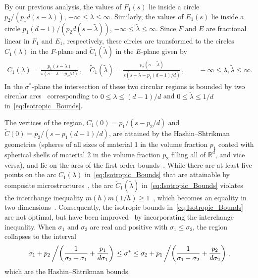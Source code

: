 \documentclass{cmslatex}
\begin{document}
By our previous analysis, the values of $F_1(s)$ lie inside a circle
$p_2/(p_1d(s-\lambda))$, $-\infty\leq\lambda\leq\infty$. Similarly, the values of $E_1(s)$ lie
inside a circle $p_1(d-1)/(p_2d(s-\tilde{\lambda}))$,
$-\infty\leq\tilde{\lambda}\leq\infty$. Since $F$ and $E$ are fractional linear in $F_1$ and
$E_1$, respectively, these circles are transformed to the circles
$C_1(\lambda)$ in the $F$-plane and $\tilde{C}_1(\tilde{\lambda})$ in the
$E$-plane given by~\cite{Golden:JMPS-333}
%
\begin{align}\label{eq:Isotropic_Bounds}
  C_1(\lambda)=\frac{p_1(s-\lambda)}{s(s-\lambda-p_2/d)}\,, \quad  %
  \tilde{C}_1(\tilde{\lambda})=\frac{p_2(s-\tilde{\lambda})}{s(s-\tilde{\lambda}-p_1(d-1)/d)}\,,
   \qquad -\infty\leq\lambda,\tilde{\lambda}\leq\infty. %
\end{align}
%
In the $\sigma^*$-plane the intersection of these two circular regions is
bounded by two circular arcs~\cite{Golden:JMPS-333} corresponding to
$0\leq\lambda\leq(d-1)/d$ and $0\leq\tilde{\lambda}\leq1/d$ in~\eqref{eq:Isotropic_Bounds}.




The vertices of the region,
$C_1(0)=p_1/(s-p_2/d)$ and $\tilde{C}(0)=p_2/(s-p_1(d-1)/d)$, are
attained by the Hashin--Shtrikman geometries (spheres of all
sizes of material 1 in the volume fraction $p_1$ coated with spherical
shells of material 2 in the volume fraction $p_2$ filling all of
$\mathbb{R}^d$, and vice versa), and lie on the arcs of the first
order bounds~\cite{Golden:JMPS-333}. While there are at least five
points on the arc $C_1(\lambda)$ in~\eqref{eq:Isotropic_Bounds} that are
attainable by composite microstructures~\cite{Milton:JAP-5286}, the
arc $\tilde{C}_1(\tilde{\lambda})$ in~\eqref{eq:Isotropic_Bounds}
violates~\cite{Golden:JMPS-333} the interchange inequality
$m(h)m(1/h)\geq1$~\cite{Keller:1964:TCC,Schulgasser:1976:CFR}, which
becomes an equality 
in two dimensions~\cite{MILTON:2002:TC}.  Consequently, the isotropic
bounds in~\eqref{eq:Isotropic_Bounds} are not optimal, but have been
improved~\cite{Milton:APL-300,Bergman:AP-78} by incorporating the
interchange inequality. When $\sigma_1$ and $\sigma_2$ are real and positive
with $\sigma_1\leq\sigma_2$, the region collapses to the interval
%
\begin{align}
  \sigma_1+p_2\left/  \left(\frac{1}{\sigma_2-\sigma_1}+\frac{p_1}{d\sigma_1}\right)\right.
  \leq\sigma^*\leq 
  \sigma_2+p_1\left/  \left(\frac{1}{\sigma_1-\sigma_2}+\frac{p_2}{d\sigma_2}\right)\right.,
\end{align}
%
which are the Hashin--Shtrikman bounds.
\end{document}
